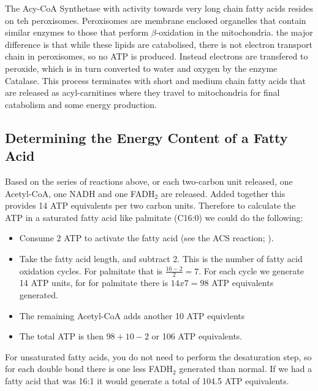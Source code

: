 \documentclass{tufte-handout}
\begin{document}
  The Acy-CoA Synthetase with activity towards very long chain fatty acids resides on teh peroxisomes.  Peroxisomes are membrane enclosed organelles that contain similar enzymes to those that perform $\beta$-oxidation in the mitochondria.  the major difference is that while these lipids are catabolised, there is not electron transport chain in peroxisomes, so no ATP is produced.  Instead electrons are transfered to peroxide, which is in turn converted to water and oxygen by the enzyme Catalase.  This process terminates with short and medium chain fatty acids that are released as acyl-carnitines where they travel to mitochondria for final catabolism and some energy production.

\subsection{Determining the Energy Content of a Fatty Acid}

Based on the series of reactions above, or each two-carbon unit released, one Acetyl-CoA, one NADH and one FADH$_2$ are released.  Added together this provides 14 ATP equivalents per two carbon units.  Therefore to calculate the ATP in a saturated fatty acid like palmitate (C16:0) we could do the following:

\begin{itemize}
\item Consume 2 ATP to activate the fatty acid (see the ACS reaction; \label{eq:acs}).
\item Take the fatty acid length, and subtract 2.  This is the number of fatty acid oxidation cycles.  For palmitate that is $\frac{16-2}{2}=7$.  For each cycle we generate 14 ATP units, for for palmitate there is $14 x 7 = 98$ ATP equivalents generated.
\item The remaining Acetyl-CoA adds another 10 ATP equivlents
\item The total ATP is then $98+10-2$ or 106 ATP equivalents.
\end{itemize}

For unsaturated fatty acids, you do not need to perform the desaturation step, so for each double bond there is one less FADH$_2$ generated than normal.  If we had a fatty acid that was 16:1 it would generate a total of 104.5 ATP equivalents.
\end{document}
